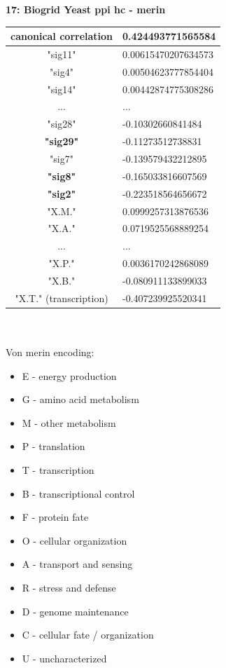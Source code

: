 \documentclass[11pt,a4paper,oneside]{report}
\begin{document}
\textbf{17: Biogrid Yeast ppi hc - merin}\\

\begin{tabular}{ c | l }
canonical correlation &  0.424493771565584\\
\hline
"sig11" & 0.00615470207634573\\
"sig4" & 0.00504623777854404\\
"sig14" & 0.00442874775308286\\
... & ...\\
"sig28" & -0.10302660841484\\
\textbf{"sig29"} & -0.11273512738831\\
"sig7" & -0.139579432212895\\
\textbf{"sig8"} & -0.165033816607569\\
\textbf{"sig2"} & -0.223518564656672\\
\hline
"X.M." & 0.0999257313876536\\
"X.A." & 0.0719525568889254\\
... & ...\\
"X.P." & 0.0036170242868089\\
"X.B." & -0.080911133899033\\
"X.T." (transcription) & -0.407239925520341\\
\end{tabular}\\\\

Von merin encoding:
\begin{itemize}
 \item E - energy production
 \item G - amino acid metabolism
 \item M - other metabolism
 \item P - translation
 \item T - transcription
 \item B - transcriptional control
 \item F - protein fate
 \item O - cellular organization
 \item A - transport and sensing
 \item R - stress and defense
 \item D - genome maintenance
 \item C - cellular fate / organization
 \item U - uncharacterized
\end{itemize}
\end{document}
